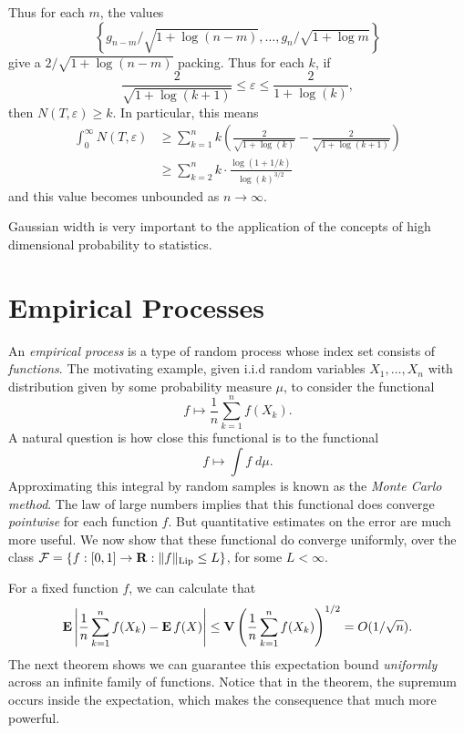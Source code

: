 \begin{example}
	Thus for each $m$, the values
	\[ \left\{ g_{n-m}/\sqrt{1 + \log(n-m)}, \dots, g_n/\sqrt{1 + \log m} \right \} \]
	give a $2/\sqrt{1 + \log(n-m)}$ packing. Thus for each $k$, if
	\[ \frac{2}{\sqrt{1 + \log(k+1)}} \leq \varepsilon \leq \frac{2}{1 + \log(k)}, \]
	then $N(T,\varepsilon) \geq k$. In particular, this means
	\begin{align*}
		\int_0^\infty N(T,\varepsilon) &\geq \sum_{k = 1}^n k \left( \frac{2}{\sqrt{1 + \log(k)}} - \frac{2}{\sqrt{1 + \log(k+1)}} \right)\\
		&\geq \sum_{k = 2}^n k \cdot \frac{\log(1 + 1/k)}{\log(k)^{3/2}}
	\end{align*}
	and this value becomes unbounded as $n \to \infty$.
\end{example}

Gaussian width is very important to the application of the concepts of high dimensional probability to statistics.

\section{Empirical Processes}

An {\it empirical process} is a type of random process whose index set consists of {\it functions}. The motivating example, given i.i.d random variables $X_1, \dots, X_n$ with distribution given by some probability measure $\mu$, to consider the functional
%
\[ f \mapsto \frac{1}{n} \sum_{k = 1}^n f(X_k). \]
%
A natural question is how close this functional is to the functional
%
\[ f \mapsto \int f\; d\mu. \]
%
Approximating this integral by random samples is known as the {\it Monte Carlo method}. The law of large numbers implies that this functional does converge {\it pointwise} for each function $f$. But quantitative estimates on the error are much more useful. We now show that these functional do converge uniformly, over the class $\mathcal{F} = \{ f: [0,1] \to \operatorname{\mathbf{R}} : \| f \|_{\text{Lip}} \leq L \}$, for some $L < \infty$.

For a fixed function $f$, we can calculate that
%
\[ \operatorname{\mathbf{E}} \left| \frac{1}{n} \sum_{k = 1}^n f(X_k) - \operatorname{\mathbf{E}} f(X) \right| \leq  \operatorname{\mathbf{V}} \left( \frac{1}{n} \sum_{k = 1}^n f(X_k) \right)^{1/2} = O(1/\sqrt{n}). \]
%
The next theorem shows we can guarantee this expectation bound {\it uniformly} across an infinite family of functions. Notice that in the theorem, the supremum occurs inside the expectation, which makes the consequence that much more powerful.

